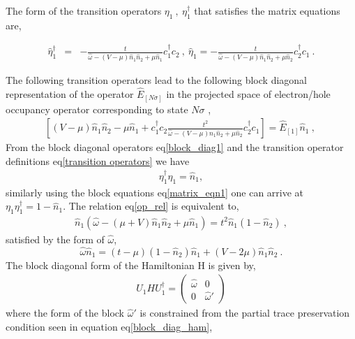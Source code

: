 \documentclass[12pt,a4paper]{article}
\begin{document}
The form of the transition operators $\eta_{1}~,~ \eta^{\dagger}_{1}$ that satisfies the matrix equations are, 
\begin{tcolorbox}
\begin{eqnarray}
\hat{\eta}^{\dagger}_{1} &=& -\frac{t}{\hat{\omega}-(V-\mu)\hat{n}_{1}\hat{n}_{2}+\mu\hat{n}_{1}}c^{\dagger}_{1}c_{2}~,~\hat{\eta}_{1} = -\frac{t}{\hat{\omega}-(V-\mu)\hat{n}_{1}\hat{n}_{2}+\mu\hat{n}_{2}}c^{\dagger}_{2}c_{1}~.\label{transition operators}
\end{eqnarray}
\end{tcolorbox}
The following transition operators lead to the following block diagonal representation of the operator $\hat{E}_{[N\sigma]}$ in the projected space of electron/hole occupancy operator corresponding to state $N\sigma$ ,
\begin{eqnarray}
\left[(V-\mu)\hat{n}_{1}\hat{n}_{2}-\mu\hat{n}_{1} +c^{\dagger}_{1}c_{2}\frac{t^{2}}{\hat{\omega}-(V-\mu)\hat{n}_{1}\hat{n}_{2}+\mu\hat{n}_{2}}c^{\dagger}_{2}c_{1}\right] = \hat{E}_{[1]}\hat{n}_{1}~,~
\label{block_diag1}
\end{eqnarray}
From the block diagonal operators eq\eqref{block_diag1} and the transition operator definitions  eq\eqref{transition operators} we have 
\begin{eqnarray}
\eta^{\dagger}_{1}\eta_{1}=\hat{n}_{1},\label{op_rel}
\end{eqnarray}
similarly using the block equations eq\eqref{matrix_eqn1} one can arrive at $\eta_{1}\eta^{\dagger}_{1}=1-\hat{n}_{1}$. The relation eq\eqref{op_rel} is equivalent to,
\begin{eqnarray}
\hat{n}_{1}(\hat{\omega} -(\mu+V)\hat{n}_{1}\hat{n}_{2}+\mu\hat{n}_{1})= t^{2}\hat{n}_{1}(1-\hat{n}_{2})~,
\end{eqnarray}
satisfied by the form of $\hat{\omega}$,
\begin{equation}
\hat{\omega}\hat{n}_{1} = (t-\mu)(1-\hat{n}_{2})\hat{n}_{1}+(V-2\mu)\hat{n}_{1}\hat{n}_{2}~.
\end{equation}
The block diagonal form of the Hamiltonian H is given by,
\begin{eqnarray}
U_{1}HU^{\dagger}_{1} =\begin{pmatrix}
\hat{\omega} & 0\\
0 & \hat{\omega}'
\end{pmatrix}
\end{eqnarray}
where the form of the block $\hat{\omega}'$ is constrained from the partial trace preservation condition seen in equation eq\eqref{block_diag_ham},
\end{document}
